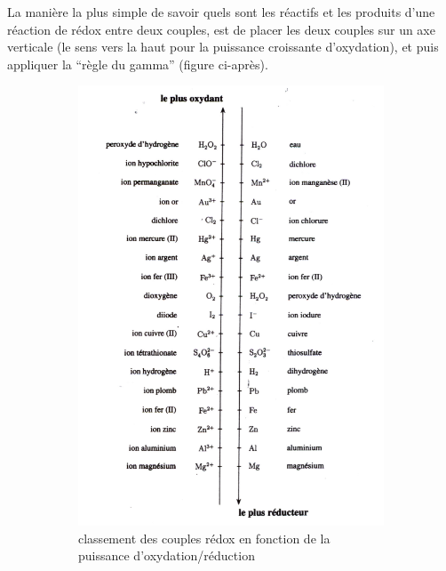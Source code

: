\documentclass[11pt,a4paper]{article}
\begin{document}
La manière la plus simple de savoir quels sont les réactifs et les produits d'une réaction de rédox entre deux couples, est de placer les deux couples sur un axe verticale (le sens vers la haut pour la puissance croissante d'oxydation), et puis appliquer la ``règle du gamma'' (figure ci-après). 
\\
\begin{figure}[H]
\centering
\begin{subfigure}{.5\textwidth}
  \centering
  \includegraphics[width=\linewidth]{imgs/c6/classementoxydant.png}  
  \caption{classement des couples rédox en fonction de la puissance d'oxydation/réduction}
\end{subfigure}
\begin{subfigure}{.4\textwidth}
  \centering

\end{subfigure}
\end{figure}
\end{document}
